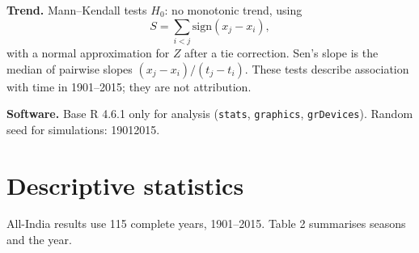 \documentclass[
]{article}
\begin{document}
\textbf{Trend.} Mann--Kendall tests \(H_0\): no monotonic trend, using
\[
S=\sum_{i<j}\mathrm{sign}(x_j-x_i),
\] with a normal approximation for \(Z\) after a tie correction. Sen's
slope is the median of pairwise slopes \((x_j-x_i)/(t_j-t_i)\). These
tests describe association with time in 1901--2015; they are not
attribution.

\textbf{Software.} Base R 4.6.1 only for analysis (\texttt{stats},
\texttt{graphics}, \texttt{grDevices}). Random seed for simulations:
19012015.

\section{Descriptive statistics}\label{descriptive-statistics}

All-India results use 115 complete years, 1901--2015. Table 2 summarises
seasons and the year.
\end{document}
